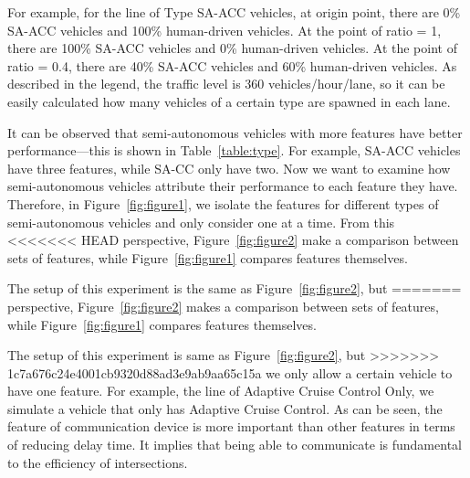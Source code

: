 For example, for the line of Type SA-ACC vehicles, at origin point,
there are 0\% SA-ACC vehicles and 100\% human-driven vehicles. At the
point of ratio = 1, there are 100\% SA-ACC vehicles and 0\%
human-driven vehicles. At the point of ratio = 0.4, there are 40\%
SA-ACC vehicles and 60\% human-driven vehicles. As described in the
legend, the traffic level is 360 vehicles/hour/lane, so it can be
easily calculated how many vehicles of a certain type are spawned in
each lane.

It can be observed that semi-autonomous vehicles with more features have better
performance---this is shown in Table~\ref{table:type}. For example,
SA-ACC vehicles have three features, while SA-CC only have two.
Now we want to examine how semi-autonomous vehicles attribute
their performance to each feature they have. Therefore, in
Figure~\ref{fig:figure1}, we isolate the features for different types
of semi-autonomous vehicles and only consider one at a time. From this
<<<<<<< HEAD
perspective, Figure~\ref{fig:figure2} make a comparison between sets of
features, while Figure~\ref{fig:figure1} compares features themselves.

The setup of this experiment is the same as Figure~\ref{fig:figure2}, but
=======
perspective, Figure~\ref{fig:figure2} makes a comparison between sets of
features, while Figure~\ref{fig:figure1} compares features themselves.

The setup of this experiment is same as Figure~\ref{fig:figure2}, but
>>>>>>> 1c7a676c24e4001cb9320d88ad3e9ab9aa65c15a
we only allow a certain vehicle to have one feature. For example, the
line of Adaptive Cruise Control Only, we simulate a vehicle that only
has Adaptive Cruise Control.  As can be seen, the feature of
communication device is more important than other features in terms of
reducing delay time.  It implies that being able to communicate
is fundamental to the efficiency of intersections.



